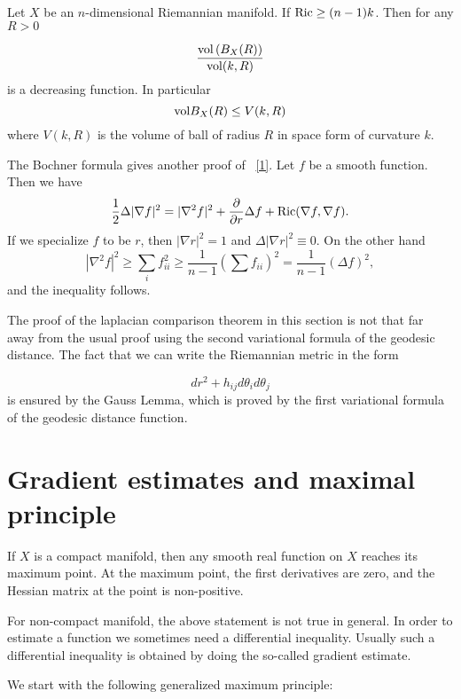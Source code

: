 \begin{corollary}[Bishop] Let $ X$ be an $n$-dimensional Riemannian manifold. If $ {\rm Ric} \geq (n-1) k$. Then for any 
$R > 0 $ 
\end{corollary}
%
\[\frac{{\rm vol}\, (B_X (R))}{{\rm vol} (k, R)} \]
%
is a decreasing function. In particular 
%
\[ {\rm vol} B_X (R) \leq V (k, R) \]
%
where $ V(k, R) $ is the volume of ball of radius $R$ in space form of curvature $k$.


\begin{remark} The Bochner formula gives another proof of ~\eqref{1}. Let $f$ be a smooth function. Then we have
%
\[\frac{1}{2} \Delta |\nabla f| ^2 = |\nabla ^2 f |^2 + \frac{\partial }{\partial r} \Delta f + {\rm Ric} ( \nabla  f, \nabla f ).\]
%
If we specialize $f$ to be $r$, then $ |\nabla r |^2 = 1 $ and $ \Delta |\nabla r| ^2 \equiv 0$.  On the other hand
%
\[| \nabla ^2 f |^2 \geq \sum_i f_{ii}^2 \geq \frac{1}{n-1} \left( \sum f_{ii} \right) ^2 = \frac{1}{n-1} ( \Delta f ) ^2,  \]
%
and the inequality follows. 
\end{remark}

\begin{remark} The proof of the laplacian comparison theorem in this section is not that far away from the usual proof using the second variational formula of the geodesic distance. The fact that we can write the Riemannian metric in the form

\[dr^2 + h_{ij} d \theta_i d \theta_j \]
is ensured  by the Gauss Lemma,  which is proved by the first variational formula of the geodesic distance function.
\end{remark}



\section{Gradient estimates and maximal principle}\label{Maximal_principle}

If $X$ is a compact manifold, then any smooth real function on $X$ reaches its maximum point. At the maximum point, the first derivatives are zero, and the Hessian matrix at the point is non-positive.

For non-compact manifold, the above statement is not true in general. In order to estimate a function we sometimes need a differential inequality. Usually such a differential inequality is obtained by doing the so-called gradient estimate.

We start with the following generalized maximum principle:

